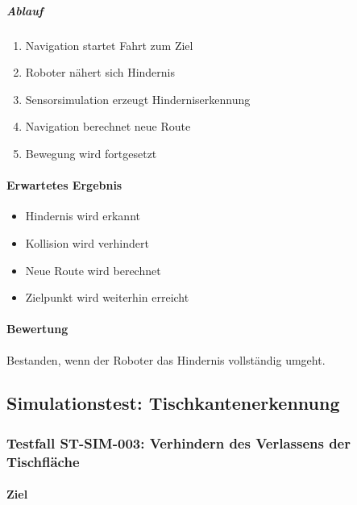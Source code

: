 \documentclass[
  a4paper,
  12pt,
  DIV=12,        %
  parskip=half,  %
  headings=small %
]{scrartcl}
\theoremstyle{definition}
\providecommand{\tightlist}{%
  \setlength{\itemsep}{0pt}\setlength{\parskip}{0pt}}
\theoremstyle{definition}
\begin{document}
\subparagraph{Ablauf}\label{ablauf-17}

\begin{enumerate}
\def\labelenumi{\arabic{enumi}.}
\tightlist
\item
  Navigation startet Fahrt zum Ziel
\item
  Roboter nähert sich Hindernis
\item
  Sensorsimulation erzeugt Hinderniserkennung
\item
  Navigation berechnet neue Route
\item
  Bewegung wird fortgesetzt
\end{enumerate}

\paragraph{Erwartetes Ergebnis}\label{erwartetes-ergebnis-17}

\begin{itemize}
\tightlist
\item
  Hindernis wird erkannt
\item
  Kollision wird verhindert
\item
  Neue Route wird berechnet
\item
  Zielpunkt wird weiterhin erreicht
\end{itemize}

\paragraph{Bewertung}\label{bewertung-17}

Bestanden, wenn der Roboter das Hindernis vollständig umgeht.

\subsection{Simulationstest:
Tischkantenerkennung}\label{simulationstest-tischkantenerkennung}

\subsubsection{Testfall ST-SIM-003: Verhindern des Verlassens der
Tischfläche}\label{testfall-st-sim-003-verhindern-des-verlassens-der-tischfluxe4che}

\paragraph{Ziel}\label{ziel-18}
\end{document}
